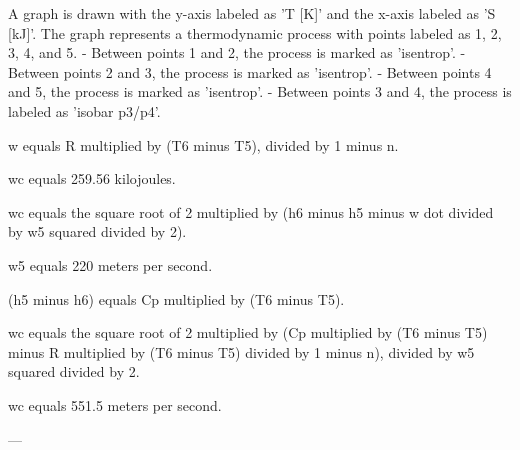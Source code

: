 A graph is drawn with the y-axis labeled as 'T [K]' and the x-axis labeled as 'S [kJ]'. The graph represents a thermodynamic process with points labeled as 1, 2, 3, 4, and 5.  
- Between points 1 and 2, the process is marked as 'isentrop'.  
- Between points 2 and 3, the process is marked as 'isentrop'.  
- Between points 4 and 5, the process is marked as 'isentrop'.  
- Between points 3 and 4, the process is labeled as 'isobar p3/p4'.

w equals R multiplied by (T6 minus T5), divided by 1 minus n.  

wc equals 259.56 kilojoules.  

wc equals the square root of 2 multiplied by (h6 minus h5 minus w dot divided by w5 squared divided by 2).  

w5 equals 220 meters per second.  

(h5 minus h6) equals Cp multiplied by (T6 minus T5).  

wc equals the square root of 2 multiplied by (Cp multiplied by (T6 minus T5) minus R multiplied by (T6 minus T5) divided by 1 minus n), divided by w5 squared divided by 2.  

wc equals 551.5 meters per second.  

---